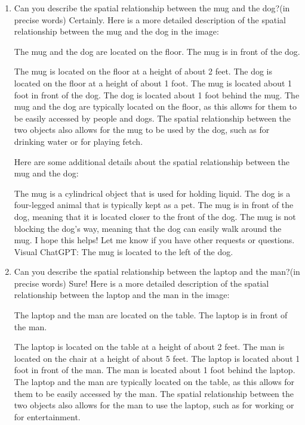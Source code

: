 \begin{enumerate}
    \item Can you describe the spatial relationship between the mug and the dog?(in precise words)
    \subitem Certainly. Here is a more detailed description of the spatial relationship between the mug and the dog in the image:

    The mug and the dog are located on the floor. The mug is in front of the dog.
    
    The mug is located on the floor at a height of about 2 feet.
    The dog is located on the floor at a height of about 1 foot.
    The mug is located about 1 foot in front of the dog.
    The dog is located about 1 foot behind the mug.
    The mug and the dog are typically located on the floor, as this allows for them to be easily accessed by people and dogs. The spatial relationship between the two objects also allows for the mug to be used by the dog, such as for drinking water or for playing fetch.
    
    Here are some additional details about the spatial relationship between the mug and the dog:
    
    The mug is a cylindrical object that is used for holding liquid.
    The dog is a four-legged animal that is typically kept as a pet.
    The mug is in front of the dog, meaning that it is located closer to the front of the dog.
    The mug is not blocking the dog's way, meaning that the dog can easily walk around the mug.
    I hope this helps! Let me know if you have other requests or questions.
    \subitem Visual ChatGPT: The mug is located to the left of the dog.
    \item Can you describe the spatial relationship between the laptop and the man?(in precise words)
    \subitem Sure! Here is a more detailed description of the spatial relationship between the laptop and the man in the image:

    The laptop and the man are located on the table. The laptop is in front of the man.
    
    The laptop is located on the table at a height of about 2 feet.
    The man is located on the chair at a height of about 5 feet.
    The laptop is located about 1 foot in front of the man.
    The man is located about 1 foot behind the laptop.
    The laptop and the man are typically located on the table, as this allows for them to be easily accessed by the man. The spatial relationship between the two objects also allows for the man to use the laptop, such as for working or for entertainment.
    

\end{enumerate}
